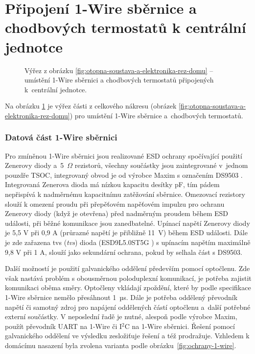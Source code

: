 \section{Připojení 1-Wire sběrnice a chodbových termostatů k centrální jednotce}

\begin{figure}[H]
    \centering
    \def\svgwidth{0.3\columnwidth}
    
    \caption[Výřez pro umístění 1-Wire sběrnici a chodbových termostatů připojených k~centrální jednotce.]{Výřez z obrázku \ref{fig:otopna-soustava-a-elektronika-rez-domu} – umístění 1-Wire sběrnici a chodbových termostatů připojených k~centrální jednotce.}
    \label{fig:vyrez-vstupy-vystupy-rpi}
\end{figure}

\label{sec:dps-se-vstupy-vystupy-pro-raspberry-pi}

Na obrázku \ref{fig:vyrez-vstupy-vystupy-rpi} je výřez části z celkového nákresu (obrázek \ref{fig:otopna-soustava-a-elektronika-rez-domu}) pro umístění 1-Wire sběrnice a~chodbových termostatů.


\subsubsection{Datová část 1-Wire sběrnici}
\label{sec:datova-cast-1-wire-sbernice}
Pro zmíněnou 1-Wire sběrnici jsou realizované ESD ochrany spočívající použití Zenerovy diody a~5~$\Omega$ rezistorů, všechny součástky jsou zaintegrované v~jednom pouzdře TSOC, integrovaný obvod je od výrobce Maxim s označením DS9503 \cite{ds9503}. Integrovaná Zenerova dioda má nízkou kapacitu desítky pF, tím pádem nepřispívá k nadměrnému kapacitnímu zatěžování sběrnice. Omezovací rezistory slouží k omezení proudu při přepěťovém napěťovém impulzu pro ochranu Zenerovy diody (když je otevřena) před nadměrným proudem během ESD události, při běžné komunikace jsou zanedbatelné. Upínací napětí Zenerovy diody je 5,5 V při 0,9 A (průrazné napětí je přibližně 11~V) během ESD události. Dále je zde zařazena \acrshort{tvs} (\textit{\acrlong{tvs}}) dioda (ESD9L5.0ST5G \cite{esd9l5-0st5g}) s upínacím napětím maximálně 9,8 V při 1 A, slouží jako sekundární ochrana, pokud by selhala část s DS9503. 

Další možností je použití galvanického oddělení především pomocí optočlenu. Zde však nastává problém s obousměrnou poloduplexní komunikací, je potřeba zajistit komunikaci oběma směry. Optočleny vkládají zpoždění, které by podle specifikace 1-Wire sběrnice nemělo přesáhnout 1~µs. Dále je potřeba oddělený převodník napětí či samotný zdroj pro napájení oddělených částí optočlenu a~další potřebné externí součástky. V neposlední řadě je nutné, alespoň podle výrobce Maxim,  použít převodník UART na 1-Wire či I$^2$C na 1-Wire sběrnici. Řešení pomocí galvanického oddělení ve výsledku zesložiťuje řešení a též prodražuje. Vzhledem k domácímu nasazení byla zvolena varianta podle obrázku~\ref{fig:ochrany-1-wire}.


